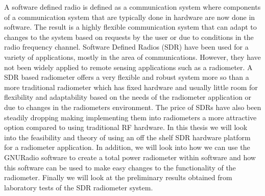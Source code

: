 
A software defined radio is defined as a communication system where components of a communication system that are typically done in hardware are now done in software.  The result is a highly flexible communication system that can adapt to changes to the system based on requests by the user or due to conditions in the radio frequency channel.  Software Defined Radios (SDR) have been used for a variety of applications, mostly in the area of communications.  However, they have not been widely applied to remote sensing applications such as a radiometer.  A SDR based radiometer offers a very flexible and robust system more so than a more traditional radiometer which has fixed hardware and usually little room for flexibility and adaptability based on the needs of the radiometer application or due to changes in the radiometers environment.  The price of SDRs have also been steadily dropping making implementing them into radiometers a more attractive option compared to using traditional RF hardware.  In this thesis we will look into the feasibility and theory of using an off the shelf SDR hardware platform for a radiometer application.  In addition, we will look into how we can use the GNURadio software to create a total power radiometer within software and how this software can be used to make easy changes to the functionality of the radiometer.  Finally we will look at the preliminary results obtained from laboratory tests of the SDR radiometer system.
